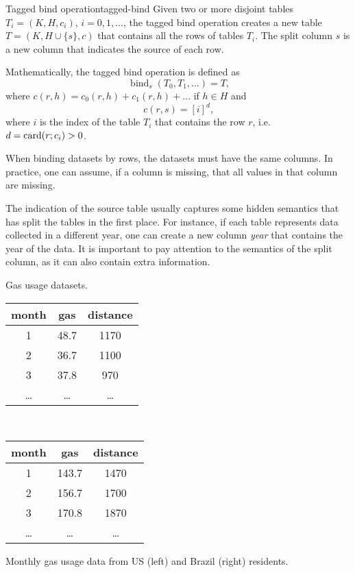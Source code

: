 \begin{defbox}{Tagged bind operation}{tagged-bind}
  Given two or more disjoint tables $T_i = (K, H, c_i)$, $i = 0, 1, \dots$, the tagged
  bind operation creates a new table $T = (K, H \cup \{s\}, c)$ that contains all the rows
  of tables $T_i$.  The split column $s$ is a new column that indicates the source of each
  row.

  Mathematically, the tagged bind operation is defined as \[
    \operatorname{bind}_{s}(T_0, T_1, \dots) = T\text{,}
  \] where $c(r, h) = c_0(r, h) + c_1(r, h) + \dots$ if $h \in H$ and \[
    c(r, s) = \left[ i \right]^{d} \text{,}
  \]
  where $i$ is the index of the table $T_i$ that contains the row $r$, i.e. $d =
  \rowcard[r; c_i] > 0$.
\end{defbox}

When binding datasets by rows, the datasets must have the same columns.  In practice,
one can assume, if a column is missing, that all values in that column are missing.

The indication of the source table usually captures some hidden semantics that has split
the tables in the first place. For instance, if each table represents data collected in a
different year, one can create a new column \emph{year} that contains the year of the
data.  It is important to pay attention to the semantics of the split column, as it can
also contain extra information.

\begin{tablebox}[label=tab:gas-usage]{Gas usage datasets.}
  \centering
  \begin{tabular}{ccc}
    \toprule
    \textbf{month} & \textbf{gas} & \textbf{distance} \\
    \midrule
    1 & 48.7 & 1170 \\
    2 & 36.7 & 1100 \\
    3 & 37.8 & 970 \\
    \dots & \dots & \dots \\
    \bottomrule
  \end{tabular}
  ~
  \begin{tabular}{ccc}
    \toprule
    \textbf{month} & \textbf{gas} & \textbf{distance} \\
    \midrule
    1 & 143.7 & 1470 \\
    2 & 156.7 & 1700 \\
    3 & 170.8 & 1870 \\
    \dots & \dots & \dots \\
    \bottomrule
  \end{tabular}
  \tcblower
  Monthly gas usage data from US (left) and Brazil (right) residents.
\end{tablebox}

